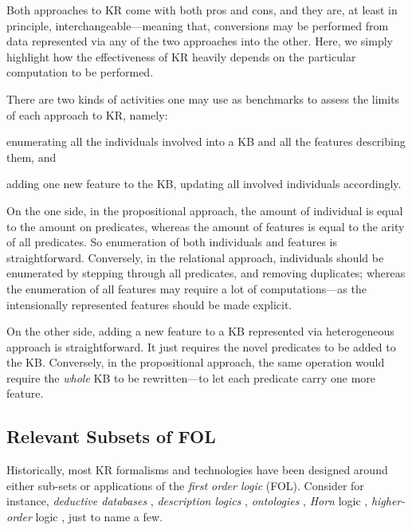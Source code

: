 \documentclass[12pt,a4paper,openright,twoside]{book}
\begin{document}
Both approaches to KR come with both pros and cons, and they are, at least in principle, interchangeable---meaning that, conversions may be performed from data represented via any of the two approaches into the other.
%
Here, we simply highlight how the effectiveness of KR heavily depends on the particular computation to be performed.

There are two kinds of activities one may use as benchmarks to assess the limits of each approach to KR, namely:
%
\begin{inlinelist}
    \item\label{item:enumerate-features} enumerating all the individuals involved into a KB and all the features describing them, and
    \item\label{item:add-features} adding one new feature to the KB, updating all involved individuals accordingly.
\end{inlinelist}

On the one side, in the propositional approach, the amount of individual is equal to the amount on predicates, whereas the amount of features is equal to the arity of all predicates.
%
So enumeration of both individuals and features is straightforward.
%
Conversely, in the relational approach, individuals should be enumerated by stepping through all predicates, and removing duplicates; whereas the enumeration of all features may require a lot of computations---as the intensionally represented features should be made explicit.

On the other side, adding a new feature to a KB represented via heterogeneous approach is straightforward.
%
It just requires the novel predicates to be added to the KB.
%
Conversely, in the propositional approach, the same operation would require the \emph{whole} KB to be rewritten---to let each predicate carry one more feature.

\subsection{Relevant Subsets of FOL}\label{ssec:fol-sub-sets}

Historically, most KR formalisms and technologies have been designed around either sub-sets or applications of the \emph{first order logic} (FOL).
%
Consider for instance, \emph{deductive databases} \cite{green1968}, \emph{description logics} \cite{baader2002}, \emph{ontologies} \cite{cimiano2006-ontologies}, \emph{Horn} logic \cite{Mcnulty1977}, \emph{higher-order} logic \cite{VanBenthem2001}, just to name a few.
\end{document}

